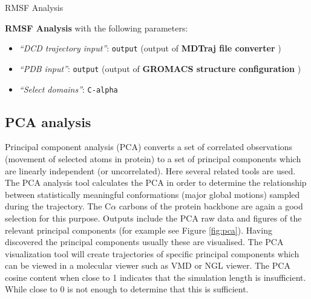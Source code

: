 \documentclass[twocolumn]{bmcart}%
\providecommand{\tightlist}{%
  \setlength{\itemsep}{0pt}\setlength{\parskip}{0pt}}
\begin{document}
\begin{handson_box_colour}{RMSF Analysis}



  \textbf{RMSF Analysis} with the following parameters:

  \begin{itemize}
  \tightlist
  \item
    \emph{``DCD trajectory input''}: \texttt{output} (output of
    \textbf{MDTraj file converter} )
  \item
    \emph{``PDB input''}: \texttt{output} (output of \textbf{GROMACS
    structure configuration} )
  \item
    \emph{``Select domains''}: \texttt{C-alpha}
  \end{itemize}



\end{handson_box_colour}


\hypertarget{pca-analysis}{%
\subsection*{PCA analysis}\label{pca-analysis}}

Principal component analysis (PCA) converts a set of correlated
observations (movement of selected atoms in protein) to a set of principal
components which are linearly independent (or uncorrelated). Here several related tools are used. 
The PCA analysis tool calculates the PCA in order to determine the relationship between statistically meaningful conformations (major global motions) sampled during the trajectory. The C$\alpha$ carbons of the protein backbone are again a good selection for this purpose.  Outputs include the PCA raw data and figures of the relevant principal components (for example see Figure \ref{fig:pca}). 
Having discovered the principal components usually these are visualised. The PCA visualization tool will create trajectories of specific principal components which can be viewed in a molecular viewer such as VMD\cite{hump_vmd_1996} or NGL viewer\cite{Rose2018ngl}. The PCA cosine content when close to 1 indicates that the simulation length is insufficient. While close to 0 is not enough to determine that this is sufficient. 
\end{document}
